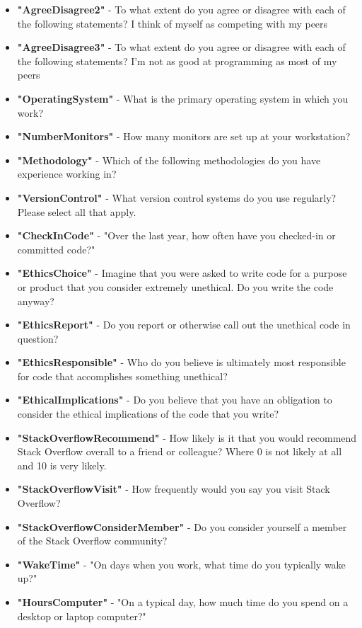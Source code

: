 \begin{appendices}
\begin{itemize}
        \item \textbf{"AgreeDisagree2"} - To what extent do you agree or disagree with each of the following statements? I think of myself as competing with my peers
        \item \textbf{"AgreeDisagree3"} - To what extent do you agree or disagree with each of the following statements? I'm not as good at programming as most of my peers
        \item \textbf{"OperatingSystem"} - What is the primary operating system in which you work?
        \item \textbf{"NumberMonitors"} - How many monitors are set up at your workstation?
        \item \textbf{"Methodology"} - Which of the following methodologies do you have experience working in?
        \item \textbf{"VersionControl"} - What version control systems do you use regularly? Please select all that apply.
        \item \textbf{"CheckInCode"} - "Over the last year, how often have you checked-in or committed code?"
        \item \textbf{"EthicsChoice"} - Imagine that you were asked to write code for a purpose or product that you consider extremely unethical. Do you write the code anyway?
        \item \textbf{"EthicsReport"} - Do you report or otherwise call out the unethical code in question?
        \item \textbf{"EthicsResponsible"} - Who do you believe is ultimately most responsible for code that accomplishes something unethical?
        \item \textbf{"EthicalImplications"} - Do you believe that you have an obligation to consider the ethical implications of the code that you write?
        \item \textbf{"StackOverflowRecommend"} - How likely is it that you would recommend Stack Overflow overall to a friend or colleague? Where 0 is not likely at all and 10 is very likely.
        \item \textbf{"StackOverflowVisit"} - How frequently would you say you visit Stack Overflow?
        \item \textbf{"StackOverflowConsiderMember"} - Do you consider yourself a member of the Stack Overflow community?
        \item \textbf{"WakeTime"} - "On days when you work, what time do you typically wake up?"
        \item \textbf{"HoursComputer"} - "On a typical day, how much time do you spend on a desktop or laptop computer?"

\end{itemize}
\end{appendices}

